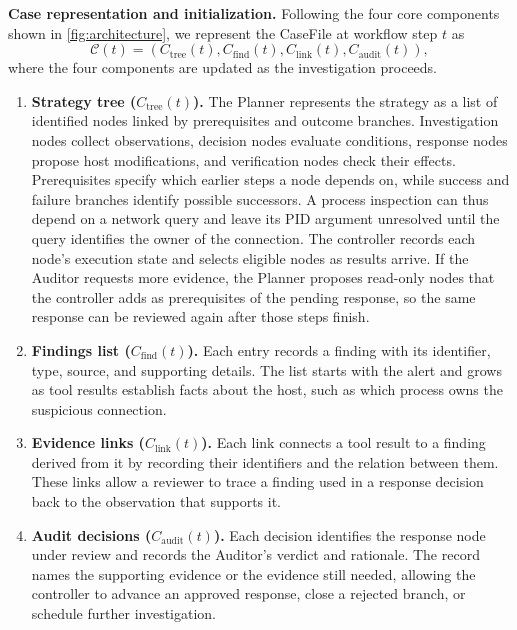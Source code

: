 \documentclass[pdflatex,sn-basic]{sn-jnl}
\begin{document}
\noindent\textbf{Case representation and initialization.} Following the four core components shown in \autoref{fig:architecture}, we represent the CaseFile at workflow step $t$ as
\begin{equation}
\mathcal{C}(t) = (C_{\mathrm{tree}}(t), C_{\mathrm{find}}(t), C_{\mathrm{link}}(t), C_{\mathrm{audit}}(t)),
\label{eq:case-representation}
\end{equation}
where the four components are updated as the investigation proceeds.
\begin{enumerate}[noitemsep, topsep=1pt, partopsep=1pt, listparindent=\parindent, leftmargin=*]
  \item \textbf{Strategy tree ($C_{\mathrm{tree}}(t)$).} The Planner represents the strategy as a list of identified nodes linked by prerequisites and outcome branches. Investigation nodes collect observations, decision nodes evaluate conditions, response nodes propose host modifications, and verification nodes check their effects. Prerequisites specify which earlier steps a node depends on, while success and failure branches identify possible successors. A process inspection can thus depend on a network query and leave its PID argument unresolved until the query identifies the owner of the connection. The controller records each node's execution state and selects eligible nodes as results arrive. If the Auditor requests more evidence, the Planner proposes read-only nodes that the controller adds as prerequisites of the pending response, so the same response can be reviewed again after those steps finish.
  \item \textbf{Findings list ($C_{\mathrm{find}}(t)$).} Each entry records a finding with its identifier, type, source, and supporting details. The list starts with the alert and grows as tool results establish facts about the host, such as which process owns the suspicious connection.
  \item \textbf{Evidence links ($C_{\mathrm{link}}(t)$).} Each link connects a tool result to a finding derived from it by recording their identifiers and the relation between them. These links allow a reviewer to trace a finding used in a response decision back to the observation that supports it.
  \item \textbf{Audit decisions ($C_{\mathrm{audit}}(t)$).} Each decision identifies the response node under review and records the Auditor's verdict and rationale. The record names the supporting evidence or the evidence still needed, allowing the controller to advance an approved response, close a rejected branch, or schedule further investigation.
\end{enumerate}
\end{document}
